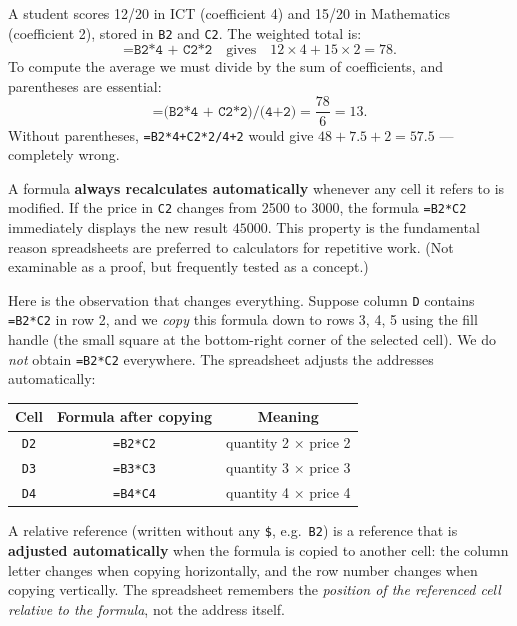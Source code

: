 \documentclass[11pt]{article}
\newcommand{\cle}[1]{{\popxbold\color{popdark}#1}}
\newcounter{popsec}
\newcounter{popsub}
\newcommand{\courssub}[1]{%
  \stepcounter{popsub}%
  \par\vspace{9pt}\noindent{\popxbold\fontsize{11.5}{13}\selectfont\color{popink}{\color{poporange}\thepopsec.\thepopsub}\hspace{6pt}#1}\par\nopagebreak\vspace{4pt}
}
\begin{document}
\begin{exemplebox}
A student scores 12/20 in ICT (coefficient 4) and 15/20 in Mathematics (coefficient 2), stored in \texttt{B2} and \texttt{C2}. The weighted total is:
\[ \texttt{=B2*4 + C2*2} \quad\text{gives}\quad 12\times 4 + 15\times 2 = 78. \]
To compute the average we must divide by the sum of coefficients, and parentheses are essential:
\[ \texttt{=(B2*4 + C2*2)/(4+2)} = \frac{78}{6} = 13. \]
Without parentheses, \texttt{=B2*4+C2*2/4+2} would give $48 + 7.5 + 2 = 57.5$ --- completely wrong.
\end{exemplebox}

\begin{propriete}
A formula \textbf{always recalculates automatically} whenever any cell it refers to is modified. If the price in \texttt{C2} changes from 2500 to 3000, the formula \texttt{=B2*C2} immediately displays the new result $45000$. This property is the fundamental reason spreadsheets are preferred to calculators for repetitive work. (Not examinable as a proof, but frequently tested as a concept.)
\end{propriete}

\courssub{Relative Referencing}

Here is the observation that changes everything. Suppose column \texttt{D} contains \texttt{=B2*C2} in row 2, and we \emph{copy} this formula down to rows 3, 4, 5 using the fill handle (the small square at the bottom-right corner of the selected cell). We do \emph{not} obtain \texttt{=B2*C2} everywhere. The spreadsheet adjusts the addresses automatically:

\begin{center}
\begin{tabular}{|c|c|c|}
\hline
\rowcolor{popblueL} \textbf{Cell} & \textbf{Formula after copying} & \textbf{Meaning} \\
\hline
\texttt{D2} & \texttt{=B2*C2} & quantity 2 $\times$ price 2 \\
\hline
\texttt{D3} & \texttt{=B3*C3} & quantity 3 $\times$ price 3 \\
\hline
\texttt{D4} & \texttt{=B4*C4} & quantity 4 $\times$ price 4 \\
\hline
\end{tabular}
\end{center}

\begin{definition}
A \cle{relative reference} (written without any \texttt{\$}, e.g.\ \texttt{B2}) is a reference that is \textbf{adjusted automatically} when the formula is copied to another cell: the column letter changes when copying horizontally, and the row number changes when copying vertically. The spreadsheet remembers the \emph{position of the referenced cell relative to the formula}, not the address itself.
\end{definition}
\end{document}
